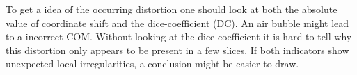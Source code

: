 

To get a idea of the occurring distortion one should look at both the absolute value of coordinate shift and the dice-coefficient (DC).
An air bubble might lead to a incorrect COM.
Without looking at the dice-coefficient it is hard to tell why this distortion only appears to be present in a few slices.
If both indicators show unexpected local irregularities, a conclusion might be easier to draw.



